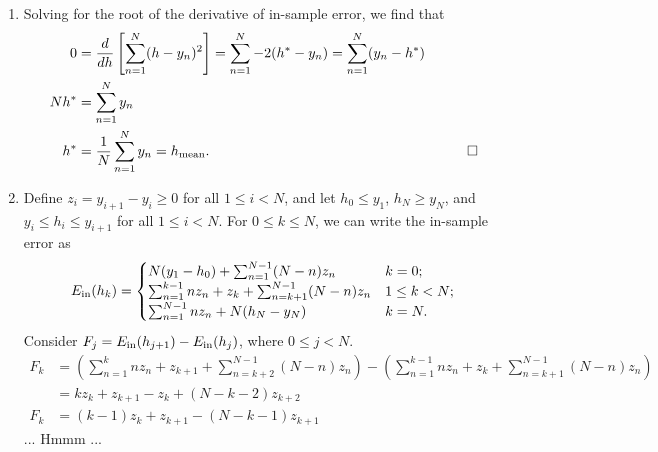 \documentclass{amsart}
\begin{document}
\begin{solution}\ 
  \begin{enumerate}
    \item Solving for the root of the derivative of in-sample error, we find
      that
      \begin{align*}
        0 &= \frac{d}{dh}\left[\sum_{n=1}^N (h - y_n)^2\right]
          = \sum_{n=1}^N -2(h^* - y_n)
          = \sum_{n=1}^N (y_n - h^*) & & \\
        N h^* &= \sum_{n=1}^N y_n & & \\
        h^* &= \frac{1}{N} \sum_{n=1}^N y_n = h_{\textup{mean}}. & &\qed
      \end{align*}
    \item Define \(z_i = y_{i+1} - y_i \geq 0\) for all \(1 \leq i < N\), and
      let
      \(h_0 \leq y_1\), \(h_{N} \geq y_N\), and \(y_i \leq h_i \leq y_{i+1}\)
      for all \(1 \leq i < N\).
      For \(0 \leq k \leq N\), we can write the in-sample error as
      \begin{equation*}
        E_{\textup{in}}(h_k) = \begin{cases}
          N(y_1 - h_0) + \sum_{n=1}^{N-1} (N - n) z_n & k = 0; \\
          \sum_{n=1}^{k-1} n z_n + z_k + \sum_{n=k+1}^{N-1} (N - n) z_n
            & 1 \leq k < N; \\
          \sum_{n=1}^{N-1} n z_n + N(h_N - y_N) & k = N.
        \end{cases}
      \end{equation*}
      Consider \(F_j = E_{\textup{in}}(h_{j+1}) - E_{\textup{in}}(h_j)\),
      where \(0 \leq j < N\).
      \begin{align*}
        F_k &= \left(\sum_{n=1}^k n z_n + z_{k+1} +
            \sum_{n=k+2}^{N-1} (N - n) z_n\right) -
          \left(\sum_{n=1}^{k-1} n z_n + z_k +
            \sum_{n=k+1}^{N-1} (N - n) z_n\right) \\
        &= k z_k + z_{k+1} - z_k + (N - k - 2) z_{k+2} \\
        F_k &= (k - 1) z_k + z_{k+1} - (N - k - 1) z_{k+1}
      \end{align*}
      ... Hmmm ...
  \end{enumerate}
\end{solution}
\end{document}
